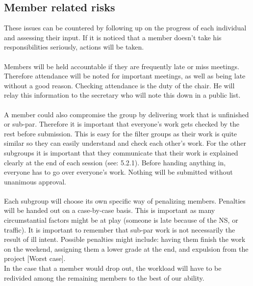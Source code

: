 \subsection{Member related risks}
These issues can be countered by following up on the progress of each individual and assessing their input. If it is noticed that a member doesn't take his responsibilities seriously, actions will be taken.\\\\
Members will be held accountable if they are frequently late or miss meetings. Therefore attendance will be noted for important meetings, as well as being late without a good reason. Checking attendance is the duty of the chair. He will relay this information to the secretary who will note this down in a public list. \\\\ A member could also compromise the group by delivering work that is unfinished or sub-par. Therefore it is important that everyone's work gets checked by the rest before submission. This is easy for the filter groups as their work is quite similar so they can easily understand and check each other's work. For the other subgroups it is important that they communicate that their work is explained clearly at the end of each session (see: 5.2.1). Before handing anything in, everyone has to go over everyone's work. Nothing will be submitted without unanimous approval. \\\\
Each subgroup will choose its own specific way of penalizing members. Penalties will be handed out on a case-by-case basis. This is important as many circumstantial factors might be at play (someone is late because of the NS, or traffic). It is important to remember that sub-par work is not necessarily the result of ill intent. Possible penalties might include: having them finish the work on the weekend, assigning them a lower grade at the end, and expulsion from the project [Worst case].
\\
In the case that a member would drop out, the workload will have to be redivided among the remaining members to the best of our ability.
